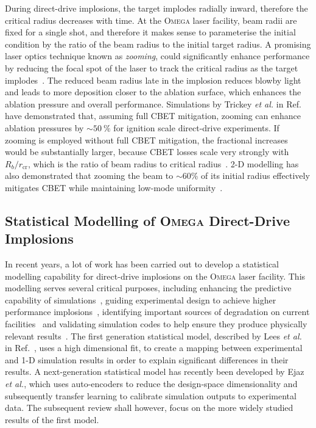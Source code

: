 During direct-drive implosions, the target implodes radially inward, therefore the critical radius decreases with time.
At the \textsc{Omega} laser facility, beam radii are fixed for a single shot, and therefore it makes sense to parameterise the initial condition by the ratio of the beam radius to the initial target radius.
A promising laser optics technique known as \textit{zooming}, could significantly enhance performance by reducing the focal spot of the laser to track the critical radius as the target implodes~\cite{kehne_implementation_2013}.
The reduced beam radius late in the implosion reduces blowby light and leads to more deposition closer to the ablation surface, which enhances the ablation pressure and overall performance.
Simulations by Trickey \textit{et al.} in Ref.~\cite{trickey_physics_2024} have demonstrated that, assuming full \ac{CBET} mitigation, zooming can enhance ablation pressures by $\sim50\ \%$ for ignition scale direct-drive experiments.
If zooming is employed without full \ac{CBET} mitigation, the fractional increases would be substantially larger, because \ac{CBET} losses scale very strongly with $R_b/r_{\text{cr}}$, which is the ratio of beam radius to critical radius~\cite{colaitis_exploration_2023}.
2-D modelling has also demonstrated that zooming the beam to $\sim60$\% of its initial radius effectively mitigates \ac{CBET} while maintaining low-mode uniformity~\cite{igumenshchev_laser-beam_2013}.

\subsection{Statistical Modelling of \textsc{Omega} Direct-Drive Implosions}%
\label{sec:Res1_OMEGA_stat_modelling}

In recent years, a lot of work has been carried out to develop a statistical modelling capability for direct-drive implosions on the \textsc{Omega} laser facility.
This modelling serves several critical purposes, including enhancing the predictive capability of simulations~\cite{lees_experimentally_2021}, guiding experimental design to achieve higher performance implosions~\cite{gopalaswamy_tripled_2019}, identifying important sources of degradation on current facilities~\cite{lees_understanding_2023,gopalaswamy_using_2021} and validating simulation codes to help ensure they produce physically relevant results~\cite{ejaz_deep_2024}.
The first generation statistical model, described by Lees \textit{et al.} in Ref.~\cite{lees_experimentally_2021}, uses a high dimensional fit, to create a mapping between experimental and 1-D simulation results in order to explain significant differences in their results.
A next-generation statistical model has recently been developed by Ejaz \textit{et al.}, which uses auto-encoders to reduce the design-space dimensionality and subsequently transfer learning to calibrate simulation outputs to experimental data.
The subsequent review shall however, focus on the more widely studied results of the first model.

